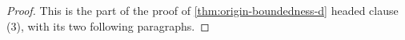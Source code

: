\begin{proof}
\leanok
This is the part of the proof of \ref{thm:origin-boundedness-d} headed clause (3), with its two
following paragraphs.
\end{proof}

%
